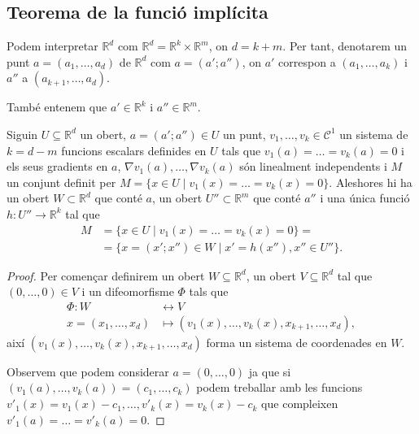 \documentclass[../Apunts.tex]{subfiles}
\begin{document}
	\subsection{Teorema de la funció implícita}
	\begin{notation}\label{notation:punts per grups}
		Podem interpretar \(\mathbb{R}^{d}\) com \(\mathbb{R}^{d}=\mathbb{R}^{k}\times\mathbb{R}^{m}\), on \(d=k+m\). Per tant, denotarem un punt \(a=(a_{1},\dots,a_{d})\) de \(\mathbb{R}^{d}\) com \(a=(a';a'')\), on \(a'\) correspon a \((a_{1},\dots,a_{k})\) i \(a''\) a \((a_{k+1},\dots,a_{d})\).%
		
		També entenem que \(a'\in\mathbb{R}^{k}\) i \(a''\in\mathbb{R}^{m}\).
	\end{notation}
	\begin{theorem}
		\label{thm:Funció implícita}
		Siguin \(U\subseteq\mathbb{R}^{d}\) un obert, \(a=(a';a'')\in U\) un punt, \(v_{1},\dots,v_{k}\in\mathcal{C}^{1}\) un sistema de \(k=d-m\) funcions escalars definides en \(U\) tals que \(v_{1}(a)=\dots=v_{k}(a)=0\) i els seus gradients en \(a\), \(\nabla v_{1}(a),\dots,\nabla v_{k}(a)\) són linealment independents i \(M\) un conjunt definit per \(M=\{x\in U\mid v_{1}(x)=\dots=v_{k}(x)=0\}\). Aleshores hi ha un obert \(W\subset\mathbb{R}^{d}\) que conté \(a\), un obert \(U''\subset\mathbb{R}^{m}\) que conté \(a''\) i una única funció \(h\colon U''\to\mathbb{R}^{k}\) tal que
		\begin{align*}
		M&=\{x\in U\mid v_{1}(x)=\dots=v_{k}(x)=0\}=\\
		&=\{x=(x';x'')\in W\mid x'=h(x''),x''\in U''\}.
		\end{align*}
		\begin{proof}%
			Per començar definirem un obert \(W\subseteq\mathbb{R}^{d}\), un obert \(V\subseteq\mathbb{R}^{d}\) tal que \((0,\dots,0)\in V\) i un difeomorfisme \(\Phi\) tals que
			\begin{align*}
			\Phi\colon W&\longleftrightarrow V\\
			x=(x_{1},\dots,x_{d})&\longmapsto(v_{1}(x),\dots,v_{k}(x),x_{k+1},\dots,x_{d}),
			\end{align*}
			així \((v_{1}(x),\dots,v_{k}(x),x_{k+1},\dots,x_{d})\) forma un sistema de coordenades en \(W\).
			
			Observem que podem considerar \(a=(0,\dots,0)\) ja que si \((v_{1}(a),\dots,v_{k}(a))=(c_{1},\dots,c_{k})\) podem treballar amb les funcions \(v'_{1}(x)=v_{1}(x)-c_{1},\dots,v'_{k}(x)=v_{k}(x)-c_{k}\) que compleixen \(v'_{1}(a)=\dots=v'_{k}(a)=0\).
			

\end{proof}
\end{theorem}
\end{document}

